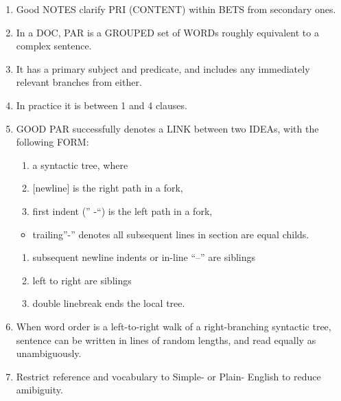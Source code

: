 \documentclass[
]{book}
\providecommand{\tightlist}{%
  \setlength{\itemsep}{0pt}\setlength{\parskip}{0pt}}
\begin{document}
\begin{enumerate}
\def\labelenumi{\arabic{enumi}.}
\setcounter{enumi}{3}
\item
  Good NOTES clarify PRI (CONTENT) within BETS from secondary ones.
\item
  In a DOC, PAR is a GROUPED set of WORDs roughly equivalent to a
  complex sentence.
\item
  It has a primary subject and predicate, and includes any immediately
  relevant branches from either.
\item
  In practice it is between 1 and 4 clauses.
\item
  GOOD PAR successfully denotes a LINK between two IDEAs, with the
  following FORM:

  \begin{enumerate}
  \def\labelenumii{\arabic{enumii}.}
  \tightlist
  \item
    a syntactic tree, where\\
  \item
    {[}newline{]} is the right path in a fork,\\
  \item
    first indent ('' -``) is the left path in a fork,\\
  \end{enumerate}

  \begin{itemize}
  \tightlist
  \item
    trailing''-'' denotes all subsequent lines in section are equal
    childs.\\
  \end{itemize}

  \begin{enumerate}
  \def\labelenumii{\arabic{enumii}.}
  \setcounter{enumii}{3}
  \tightlist
  \item
    subsequent newline indents or in-line ``--'' are siblings\\
  \item
    left to right are siblings\\
  \item
    double linebreak ends the local tree.
  \end{enumerate}
\item
  When word order is a left-to-right walk of a right-branching
  syntactic tree, sentence can be written in lines of random lengths,
  and read equally as unambiguously.
\item
  Restrict reference and vocabulary to Simple- or Plain- English to
  reduce amibiguity.
\end{enumerate}
\end{document}
